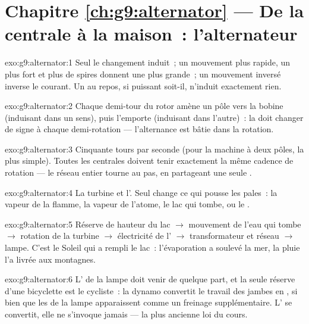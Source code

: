 \section*{Chapitre \ref{ch:g9:alternator} --- De la centrale à la maison~: l'alternateur}

\begin{solution}{exo:g9:alternator:1}
Seul le changement induit~; un mouvement plus rapide, un  plus
fort et plus de spires donnent une  plus grande~; un mouvement
inversé inverse le courant. Un  au repos, si puissant soit-il,
n'induit exactement rien.
\end{solution}

\begin{solution}{exo:g9:alternator:2}
Chaque demi-tour du rotor amène un pôle vers la bobine (induisant dans
un sens), puis l'emporte (induisant dans l'autre)~: la  doit
changer de signe à chaque demi-rotation --- l'alternance est bâtie
dans la rotation.
\end{solution}

\begin{solution}{exo:g9:alternator:3}
Cinquante tours par seconde (pour la machine à deux pôles, la plus
simple). Toutes les centrales doivent tenir exactement la même cadence
de rotation --- le réseau entier tourne au pas, en partageant une seule
.
\end{solution}

\begin{solution}{exo:g9:alternator:4}
La turbine et l'. Seul change ce qui pousse les pales~: la
vapeur de la flamme, la vapeur de l'atome, le lac qui tombe, ou le
.
\end{solution}

\begin{solution}{exo:g9:alternator:5}
Réserve de hauteur du lac $\to$ mouvement de l'eau qui tombe $\to$
rotation de la turbine $\to$ électricité de l' $\to$
transformateur et réseau $\to$ lampe. C'est le Soleil qui a rempli le
lac~: l'évaporation a soulevé la mer, la pluie l'a livrée aux
montagnes.
\end{solution}

\begin{solution}{exo:g9:alternator:6}
L' de la lampe doit venir de quelque part, et la seule réserve
d'une bicyclette est le cycliste~: la dynamo convertit le travail des
jambes en , si bien que les  de la lampe apparaissent
comme un freinage supplémentaire. L' se convertit, elle ne
s'invoque jamais --- la plus ancienne loi du cours.
\end{solution}

